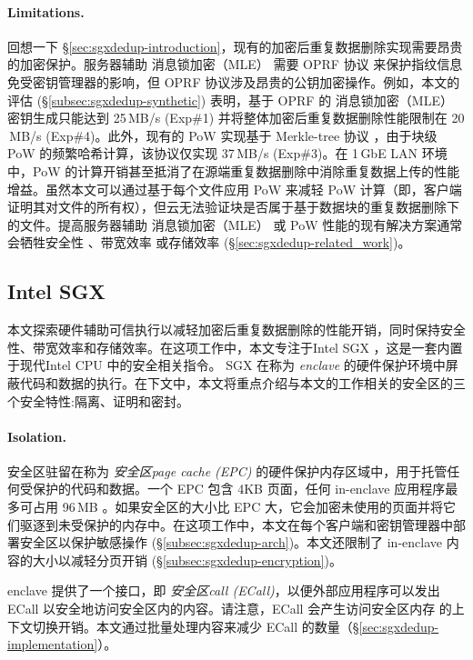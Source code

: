 \paragraph*{Limitations.} 回想一下 \S\ref{sec:sgxdedup-introduction}，现有的加密后重复数据删除实现需要昂贵的加密保护。服务器辅助 消息锁加密（MLE） 需要 OPRF 协议 \cite{naor2004Number} 来保护指纹信息免受密钥管理器的影响，但 OPRF 协议涉及昂贵的公钥加密操作。例如，本文的评估 (\S\ref{subsec:sgxdedup-synthetic}) 表明，基于 OPRF 的 消息锁加密（MLE） 密钥生成只能达到 25\,MB/s (Exp\#1) 并将整体加密后重复数据删除性能限制在 20 \,MB/s (Exp\#4)。此外，现有的 PoW 实现基于 Merkle-tree 协议 \cite{halevi11}，由于块级 PoW 的频繁哈希计算，该协议仅实现 37\,MB/s (Exp\#3)。在 1\,GbE LAN 环境中，PoW 的计算开销甚至抵消了在源端重复数据删除中消除重复数据上传的性能增益。虽然本文可以通过基于每个文件应用 PoW 来减轻 PoW 计算（即，客户端证明其对文件的所有权），但云无法验证块是否属于基于数据块的重复数据删除下的文件。提高服务器辅助 消息锁加密（MLE） 或 PoW 性能的现有解决方案通常会牺牲安全性 \cite{li20b,xu2013weak,pietro12}、带宽效率 \cite{harnik10,li15} 或存储效率 \cite{zhou2015secdep,qin17,li20b} (\S\ref{sec:sgxdedup-related_work})。

\subsection{Intel SGX}
\label{subsec:sgxdedup-sgx} 

本文探索硬件辅助可信执行以减轻加密后重复数据删除的性能开销，同时保持安全性、带宽效率和存储效率。在这项工作中，本文专注于Intel SGX \cite{sgx}，这是一套内置于现代Intel CPU 中的安全相关指令。 SGX 在称为 \textit{ enclave} 的硬件保护环境中屏蔽代码和数据的执行。在下文中，本文将重点介绍与本文的工作相关的安全区的三个安全特性:隔离、证明和密封。

\paragraph*{Isolation.}安全区驻留在称为 \textit{安全区page cache (EPC)} 的硬件保护内存区域中，用于托管任何受保护的代码和数据。一个 EPC 包含 4KB 页面，任何 in-enclave 应用程序最多可占用 96\,MB \cite{harnik18}。如果安全区的大小比 EPC 大，它会加密未使用的页面并将它们驱逐到未受保护的内存中。在这项工作中，本文在每个客户端和密钥管理器中部署安全区以保护敏感操作 (\S\ref{subsec:sgxdedup-arch})。本文还限制了 in-enclave 内容的大小以减轻分页开销 (\S\ref{subsec:sgxdedup-encryption})。

enclave 提供了一个接口，即 \textit{安全区call (ECall)}，以便外部应用程序可以发出 ECall 以安全地访问安全区内的内容。请注意，ECall 会产生访问安全区内存 \cite{harnik18} 的上下文切换开销。本文通过批量处理内容来减少 ECall 的数量（\S\ref{sec:sgxdedup-implementation}）。

